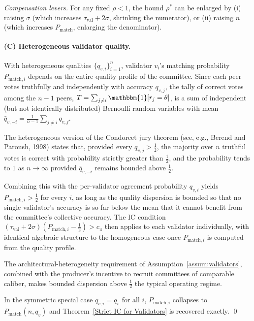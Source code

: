 \textit{Compensation levers.} For any fixed $\rho < 1$, the bound $\rho^*$ can be enlarged by (i) raising $\sigma$ (which increases $\tau_{\text{val}} + 2\sigma$, shrinking the numerator), or (ii) raising $n$ (which increases $P_{\text{match}}$, enlarging the denominator).

\paragraph{(C) Heterogeneous validator quality.}
With heterogeneous qualities $\{q_{v,i}\}_{i=1}^n$, validator $v_i$'s matching probability $P_{\text{match},i}$ depends on the entire quality profile of the committee. Since each peer votes truthfully and independently with accuracy $q_{v,j}$, the tally of correct votes among the $n-1$ peers, $T = \sum_{j \neq i} \mathbbm{1}[r_j = \theta]$, is a sum of independent (but not identically distributed) Bernoulli random variables with mean $\bar{q}_{v,-i} = \frac{1}{n-1}\sum_{j \neq i} q_{v,j}$.

The heterogeneous version of the Condorcet jury theorem (see, e.g., Berend and Paroush, 1998) states that, provided every $q_{v,j} > \tfrac{1}{2}$, the majority over $n$ truthful votes is correct with probability strictly greater than $\tfrac{1}{2}$, and the probability tends to $1$ as $n \to \infty$ provided $\bar{q}_{v,-i}$ remains bounded above $\tfrac{1}{2}$.

Combining this with the per-validator agreement probability $q_{v,i}$ yields $P_{\text{match},i} > \tfrac{1}{2}$ for every $i$, as long as the quality dispersion is bounded so that no single validator's accuracy is so far below the mean that it cannot benefit from the committee's collective accuracy. The IC condition $(\tau_{\text{val}} + 2\sigma)(P_{\text{match},i} - \tfrac{1}{2}) > c_u$ then applies to each validator individually, with identical algebraic structure to the homogeneous case once $P_{\text{match},i}$ is computed from the quality profile.

The architectural-heterogeneity requirement of Assumption~\ref{assum:validators}, combined with the producer's incentive to recruit committees of comparable caliber, makes bounded dispersion above $\frac{1}{2}$ the typical operating regime.

In the symmetric special case $q_{v,i} = q_v$ for all $i$, $P_{\text{match},i}$ collapses to $P_{\text{match}}(n, q_v)$ and Theorem~\ref{Strict IC for Validators} is recovered exactly. \qed
